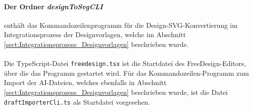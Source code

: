 \paragraph{Der Ordner \emph{designToSvgCLI}} enthält das Kommandozeilenprogramm für die Design-SVG-Konvertierung im Integrationsprozess der Designvorlagen, welche im Abschnitt \ref{sect:Integrationsprozess_Designvorlagen} beschrieben wurde.


\paragraph{}Die TypeScript-Datei \lstinline|freedesign.tsx| ist die Startdatei des FreeDesign-Editors, über die das Programm gestartet wird. Für das Kommandozeilen-Programm zum Import der AI-Dateien, welches ebenfalls in Abschnitt \ref{sect:Integrationsprozess_Designvorlagen} beschrieben wurde, ist die Datei \lstinline|draftImporterCli.ts| als Startdatei vorgesehen.







